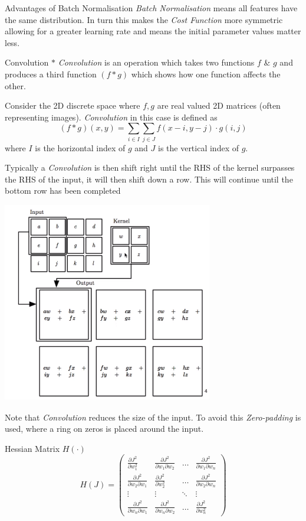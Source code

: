\documentclass[11pt,a4paper]{article}
\begin{document}
  \begin{remark}{Advantages of Batch Normalisation}
    \textit{Batch Normalisation} means all features have the same distribution. In turn this makes the \textit{Cost Function} more symmetric allowing for a greater learning rate and means the initial parameter values matter less.
  \end{remark}


  \begin{definition}{Convolution $*$}
    \textit{Convolution} is an operation which takes two functions $f$ \& $g$ and produces a third function $(f*g)$ which shows how one function affects the other.
    \par Consider the 2D discrete space where $f,g$ are real valued 2D matrices (often representing images). \textit{Convolution} in this case is defined as
    \[ (f*g)(x,y)=\sum_{i\in I}\sum_{j\in J}f(x-i,y-j)\cdot g(i,j) \]
    where $I$ is the horizontal index of $g$ and $J$ is the vertical index of $g$.
    \par Typically a \textit{Convolution} is then shift right until the RHS of the kernel surpasses the RHS of the input, it will then shift down a row. This will continue until the bottom row has been completed
    \begin{center}
      \includegraphics[width=.35\textwidth]{2dConvolution.PNG}
    \end{center}
    Note that \textit{Convolution} reduces the size of the input. To avoid this \textit{Zero-padding} is used, where a ring on zeros is placed around the input.
  \end{definition}

  \begin{definition}{Hessian Matrix $H(\cdot)$}
    \[ H(J)=\begin{pmatrix}\frac{\partial J^2}{\partial w_1^2}&\frac{\partial J^2}{\partial w_1\partial w_2}&\dots&\frac{\partial J^2}{\partial w_1\partial w_n}\\\frac{\partial J^2}{\partial w_2\partial w_1}&\frac{\partial J^2}{\partial w_2^2}&\dots&\frac{\partial J^2}{\partial w_2\partial w_n}\\\vdots&\vdots&\ddots&\vdots\\\frac{\partial J^2}{\partial w_n\partial w_1}&\frac{\partial J^2}{\partial w_n\partial w_2}&\dots&\frac{\partial J^2}{\partial w_n^2}\end{pmatrix}\]
  \end{definition}
\end{document}
